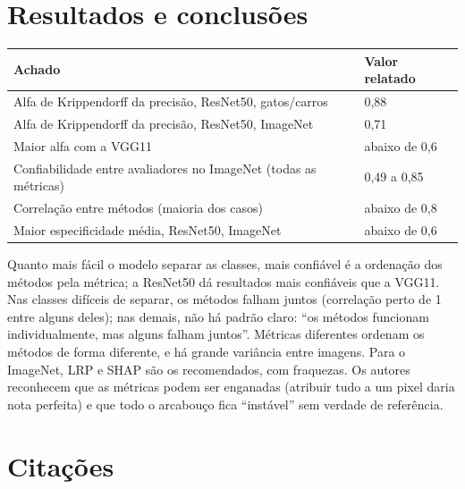 \documentclass[11pt,a4paper]{article}
\begin{document}
\section{Resultados e conclusões}
\begin{center}
\small
\begin{tabularx}{\linewidth}{Xl}
\toprule
Achado & Valor relatado \\
\midrule
Alfa de Krippendorff da precisão, ResNet50, gatos/carros & 0,88 \\
Alfa de Krippendorff da precisão, ResNet50, ImageNet & 0,71 \\
Maior alfa com a VGG11 & abaixo de 0,6 \\
Confiabilidade entre avaliadores no ImageNet (todas as métricas) & 0,49 a 0,85 \\
Correlação entre métodos (maioria dos casos) & abaixo de 0,8 \\
Maior especificidade média, ResNet50, ImageNet & abaixo de 0,6 \\
\bottomrule
\end{tabularx}
\end{center}
Quanto mais fácil o modelo separar as classes, mais confiável é a ordenação dos métodos pela métrica; a ResNet50 dá resultados mais confiáveis que a VGG11. Nas classes difíceis de separar, os métodos falham juntos (correlação perto de 1 entre alguns deles); nas demais, não há padrão claro: “os métodos funcionam individualmente, mas alguns falham juntos”. Métricas diferentes ordenam os métodos de forma diferente, e há grande variância entre imagens. Para o ImageNet, LRP e SHAP são os recomendados, com fraquezas. Os autores reconhecem que as métricas podem ser enganadas (atribuir tudo a um pixel daria nota perfeita) e que todo o arcabouço fica “instável” sem verdade de referência.

\section{Citações}
\end{document}
